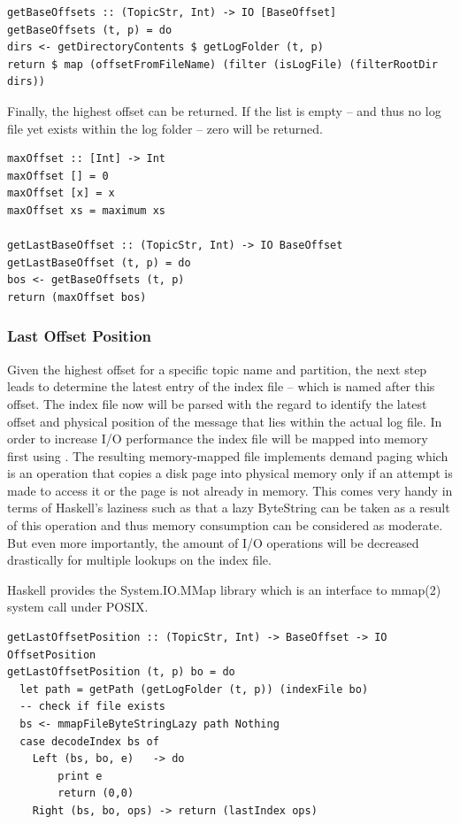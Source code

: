 \begin{lstlisting}
getBaseOffsets :: (TopicStr, Int) -> IO [BaseOffset]
getBaseOffsets (t, p) = do
dirs <- getDirectoryContents $ getLogFolder (t, p)
return $ map (offsetFromFileName) (filter (isLogFile) (filterRootDir dirs))
\end{lstlisting}

Finally, the highest offset can be returned. If the list is empty -- and thus no log file 
yet exists within the log folder -- zero will be returned.

\begin{lstlisting}
maxOffset :: [Int] -> Int
maxOffset [] = 0
maxOffset [x] = x
maxOffset xs = maximum xs

getLastBaseOffset :: (TopicStr, Int) -> IO BaseOffset
getLastBaseOffset (t, p) = do
bos <- getBaseOffsets (t, p)
return (maxOffset bos)
\end{lstlisting}

\subsubsection{Last Offset Position}

Given the highest offset for a specific topic name and partition, the next step
leads to determine the latest entry of the index file -- which is named after
this offset. The index file now will be parsed with the regard to identify the
latest offset and physical position of the message that lies within the actual
log file. In order to increase I/O performance the index file will be mapped
into memory first using
. The resulting
memory-mapped file implements demand paging which is an operation that copies a
disk page into physical memory only if an attempt is made to access it or the
page is not already in memory. This comes very handy in terms of Haskell's
laziness such as that a lazy ByteString can be taken as a result of this
operation and thus memory consumption can be considered as moderate. But even
more importantly, the amount of I/O operations will be decreased drastically
for multiple lookups on the index file.

Haskell provides the System.IO.MMap library which is an interface to mmap(2)
system call under POSIX. 


\begin{lstlisting}
getLastOffsetPosition :: (TopicStr, Int) -> BaseOffset -> IO OffsetPosition
getLastOffsetPosition (t, p) bo = do 
  let path = getPath (getLogFolder (t, p)) (indexFile bo)
  -- check if file exists
  bs <- mmapFileByteStringLazy path Nothing
  case decodeIndex bs of
    Left (bs, bo, e)   -> do
        print e
        return (0,0)
    Right (bs, bo, ops) -> return (lastIndex ops)
\end{lstlisting}

